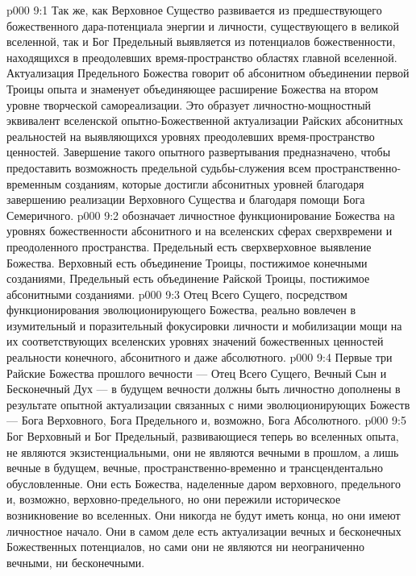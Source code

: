 \vs p000 9:1 Так же, как Верховное Существо развивается из предшествующего божественного дара\hyp{}потенциала энергии и личности, существующего в великой вселенной, так и Бог Предельный выявляется из потенциалов божественности, находящихся в преодолевших время\hyp{}пространство областях главной вселенной. Актуализация Предельного Божества говорит об абсонитном объединении первой Троицы опыта и знаменует объединяющее расширение Божества на втором уровне творческой самореализации. Это образует личностно\hyp{}мощностный эквивалент вселенской опытно\hyp{}Божественной актуализации Райских абсонитных реальностей на выявляющихся уровнях преодолевших время\hyp{}пространство ценностей. Завершение такого опытного развертывания предназначено, чтобы предоставить возможность предельной судьбы\hyp{}служения всем пространственно\hyp{}временным созданиям, которые достигли абсонитных уровней благодаря завершению реализации Верховного Существа и благодаря помощи Бога Семеричного.
\vs p000 9:2 \pc {} обозначает личностное функционирование Божества на уровнях божественности абсонитного и на вселенских сферах сверхвремени и преодоленного пространства. Предельный есть сверхверховное выявление Божества. Верховный есть объединение Троицы, постижимое конечными созданиями, Предельный есть объединение Райской Троицы, постижимое абсонитными созданиями.
\vs p000 9:3 Отец Всего Сущего, посредством функционирования эволюционирующего Божества, реально вовлечен в изумительный и поразительный  фокусировки личности и мобилизации мощи на их соответствующих вселенских уровнях значений божественных ценностей реальности конечного, абсонитного и даже абсолютного.
\vs p000 9:4 Первые три Райские Божества прошлого вечности --- Отец Всего Сущего, Вечный Сын и Бесконечный Дух --- в будущем вечности должны быть личностно дополнены в результате опытной актуализации связанных с ними эволюционирующих Божеств --- Бога Верховного, Бога Предельного и, возможно, Бога Абсолютного.
\vs p000 9:5 \pc Бог Верховный и Бог Предельный, развивающиеся теперь во вселенных опыта, не являются экзистенциальными, они не являются вечными в прошлом, а лишь вечные в будущем, вечные, пространственно\hyp{}временно и трансцендентально обусловленные. Они есть Божества, наделенные даром верховного, предельного и, возможно, верховно\hyp{}предельного, но они пережили историческое возникновение во вселенных. Они никогда не будут иметь конца, но они имеют личностное начало. Они в самом деле есть актуализации вечных и бесконечных Божественных потенциалов, но сами они не являются ни неограниченно вечными, ни бесконечными.
